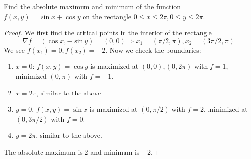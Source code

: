 \documentclass[openany]{book}
\begin{document}
\begin{prob}
    Find the absolute maximum and minimum of the function $f(x,y)=\sin x+\cos y$ on the rectangle $0\leq x\leq 2\pi, 0\leq y\leq 2\pi$.
\end{prob}
\begin{proof}
    We first find the critical points in the interior of the rectangle 
    \begin{equation*}
        \nabla f=(\cos x, -\sin y)=(0,0)\Rightarrow x_1=(\pi/2, \pi), x_2=(3\pi/2, \pi)
    \end{equation*}
    We see $f(x_1)=0, f(x_2)=-2$. Now we check the boundaries:
    \begin{enumerate}
        \item $x=0$: $f(x,y)=\cos y$ is maximized at $(0, 0), (0,2\pi)$ with $f=1$, minimized $(0,\pi)$ with $f=-1$.
        \item $x=2\pi$, similar to the above.
        \item $y=0$, $f(x,y)=\sin x$ is maximized at $(0, \pi/2)$ with $f=2$, minimized at $(0, 3\pi/2)$ with $f=0$.
        \item $y=2\pi$, similar to the above. 
    \end{enumerate}
    The absolute maximum is $2$ and minimum is $-2$.
\end{proof}
\end{document}
